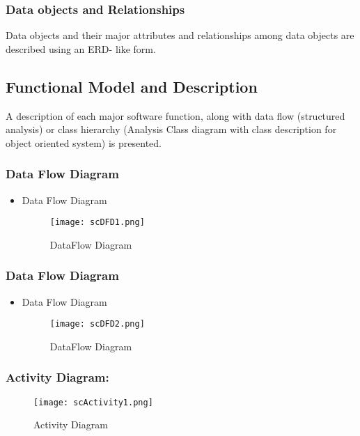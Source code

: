 \documentclass[10pt,a4paper]
{article}
\numberwithin{table}{section}
\begin{document}
{{\begin{normalsize}
\subsubsection{Data objects and Relationships}
\hspace*{0.3cm}  Data objects and their major attributes and relationships among data objects are described using an ERD- like form.
\subsection{Functional Model and Description}  
\hspace*{0.3cm}A description of each major software function, along with data flow (structured analysis) or class hierarchy (Analysis Class diagram with class description for object oriented system) is presented.
\subsubsection{Data Flow Diagram}  
\begin{itemize}
\item Data Flow Diagram 
\begin{center}
	  \begin{figure}[h]
			\centering
			\texttt{[image: scDFD1.png]}
			\caption{DataFlow Diagram}
		\end{figure}
	\end{center}


\end{itemize}

\subsubsection{Data Flow Diagram}  
\begin{itemize}
\item Data Flow Diagram 
\begin{center}
	  \begin{figure}[h]
			\centering
			\texttt{[image: scDFD2.png]}
			\caption{DataFlow Diagram}
		\end{figure}
	\end{center}


\end{itemize}

\newpage
\subsubsection{Activity Diagram:}
\begin{figure}[h]
			\centering
			\texttt{[image: scActivity1.png]}
			\caption{Activity Diagram}
		\end{figure}


\end{normalsize}}}
\end{document}
